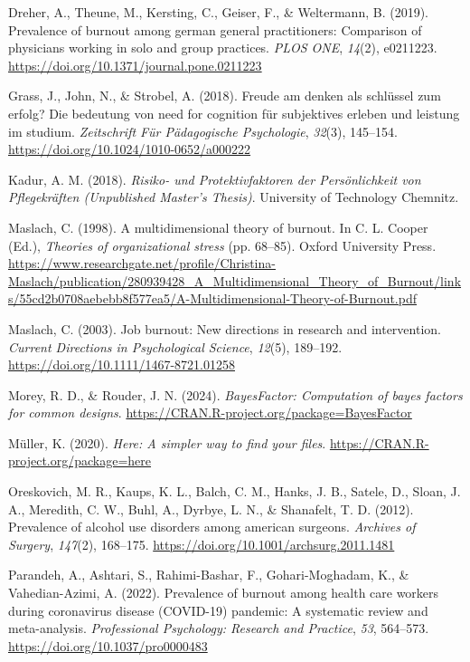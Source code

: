 \documentclass[
  man]{apa6}
\newlength{\cslhangindent}
\newenvironment{CSLReferences}[2] %
 {\begin{list}{}{%
  \setlength{\itemindent}{0pt}
  \setlength{\leftmargin}{0pt}
  \setlength{\parsep}{0pt}
  \ifodd #1
   \setlength{\leftmargin}{\cslhangindent}
   \setlength{\itemindent}{-1\cslhangindent}
  \fi
  \setlength{\itemsep}{#2\baselineskip}}}
 {\end{list}}
\begin{document}
\begin{CSLReferences}{1}{0}
Dreher, A., Theune, M., Kersting, C., Geiser, F., \& Weltermann, B. (2019). Prevalence of burnout among german general practitioners: Comparison of physicians working in solo and group practices. \emph{PLOS ONE}, \emph{14}(2), e0211223. \url{https://doi.org/10.1371/journal.pone.0211223}

Grass, J., John, N., \& Strobel, A. (2018). Freude am denken als schlüssel zum erfolg? Die bedeutung von need for cognition für subjektives erleben und leistung im studium. \emph{Zeitschrift Für Pädagogische Psychologie}, \emph{32}(3), 145--154. \url{https://doi.org/10.1024/1010-0652/a000222}

Kadur, A. M. (2018). \emph{{Risiko}- und {Protektivfaktoren} der {Persönlichkeit} von {Pflegekräften} ({Unpublished Master's Thesis})}. University of Technology Chemnitz.

Maslach, C. (1998). A multidimensional theory of burnout. In C. L. Cooper (Ed.), \emph{Theories of organizational stress} (pp. 68--85). Oxford University Press. \url{https://www.researchgate.net/profile/Christina-Maslach/publication/280939428_A_Multidimensional_Theory_of_Burnout/links/55cd2b0708aebebb8f577ea5/A-Multidimensional-Theory-of-Burnout.pdf}

Maslach, C. (2003). Job burnout: New directions in research and intervention. \emph{Current Directions in Psychological Science}, \emph{12}(5), 189--192. \url{https://doi.org/10.1111/1467-8721.01258}

Morey, R. D., \& Rouder, J. N. (2024). \emph{BayesFactor: Computation of bayes factors for common designs}. \url{https://CRAN.R-project.org/package=BayesFactor}

Müller, K. (2020). \emph{Here: A simpler way to find your files}. \url{https://CRAN.R-project.org/package=here}

Oreskovich, M. R., Kaups, K. L., Balch, C. M., Hanks, J. B., Satele, D., Sloan, J. A., Meredith, C. W., Buhl, A., Dyrbye, L. N., \& Shanafelt, T. D. (2012). Prevalence of alcohol use disorders among american surgeons. \emph{Archives of Surgery}, \emph{147}(2), 168--175. \url{https://doi.org/10.1001/archsurg.2011.1481}

Parandeh, A., Ashtari, S., Rahimi-Bashar, F., Gohari-Moghadam, K., \& Vahedian-Azimi, A. (2022). Prevalence of burnout among health care workers during coronavirus disease ({COVID-19}) pandemic: A systematic review and meta-analysis. \emph{Professional Psychology: Research and Practice}, \emph{53}, 564--573. \url{https://doi.org/10.1037/pro0000483}


\end{CSLReferences}
\end{document}
